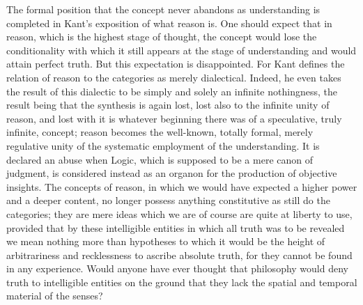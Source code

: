 The formal position that the concept
never abandons as understanding
is completed in Kant's exposition of what reason is.
One should expect that in reason,
which is the highest stage of thought,
the concept would lose the conditionality
with which it still appears at the stage of understanding
and would attain perfect truth.
But this expectation is disappointed.
For Kant defines the relation of reason
to the categories as merely dialectical.
Indeed, he even takes the result of this dialectic
to be simply and solely an infinite nothingness,
the result being that the synthesis is again lost,
lost also to the infinite unity of reason,
and lost with it is whatever beginning
there was of a speculative, truly infinite, concept;
reason becomes the well-known, totally formal,
merely regulative unity of the
systematic employment of the understanding.
It is declared an abuse when Logic,
which is supposed to be a mere canon of judgment,
is considered instead as an organon for
the production of objective insights.
The concepts of reason, in which we would have expected
a higher power and a deeper content,
no longer possess anything constitutive
as still do the categories;
they are mere ideas
which we are of course are quite at liberty to use,
provided that by these intelligible entities
in which all truth was to be revealed
we mean nothing more than hypotheses
to which it would be the height
of arbitrariness and recklessness
to ascribe absolute truth,
for they cannot be found in any experience.
Would anyone have ever thought that
philosophy would deny truth to intelligible entities
on the ground that they lack the
spatial and temporal material of the senses?

